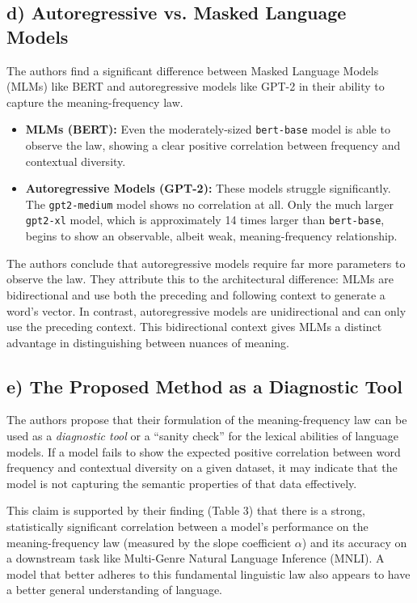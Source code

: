 \documentclass{solutionclass} %
\begin{document}
\subsection{d) Autoregressive vs. Masked Language Models}
The authors find a significant difference between Masked Language Models (MLMs) like BERT and autoregressive models like GPT-2 in their ability to capture the meaning-frequency law.
\begin{itemize}
    \item \textbf{MLMs (BERT):} Even the moderately-sized \texttt{bert-base} model is able to observe the law, showing a clear positive correlation between frequency and contextual diversity.
    \item \textbf{Autoregressive Models (GPT-2):} These models struggle significantly. The \texttt{gpt2-medium} model shows no correlation at all. Only the much larger \texttt{gpt2-xl} model, which is approximately 14 times larger than \texttt{bert-base}, begins to show an observable, albeit weak, meaning-frequency relationship.
\end{itemize}
The authors conclude that autoregressive models require far more parameters to observe the law. They attribute this to the architectural difference: MLMs are bidirectional and use both the preceding and following context to generate a word's vector. In contrast, autoregressive models are unidirectional and can only use the preceding context. This bidirectional context gives MLMs a distinct advantage in distinguishing between nuances of meaning.

\subsection{e) The Proposed Method as a Diagnostic Tool}
The authors propose that their formulation of the meaning-frequency law can be used as a \emph{diagnostic tool} or a ``sanity check'' for the lexical abilities of language models. If a model fails to show the expected positive correlation between word frequency and contextual diversity on a given dataset, it may indicate that the model is not capturing the semantic properties of that data effectively.

This claim is supported by their finding (Table 3) that there is a strong, statistically significant correlation between a model's performance on the meaning-frequency law (measured by the slope coefficient $\alpha$) and its accuracy on a downstream task like Multi-Genre Natural Language Inference (MNLI). A model that better adheres to this fundamental linguistic law also appears to have a better general understanding of language.
\end{document}
